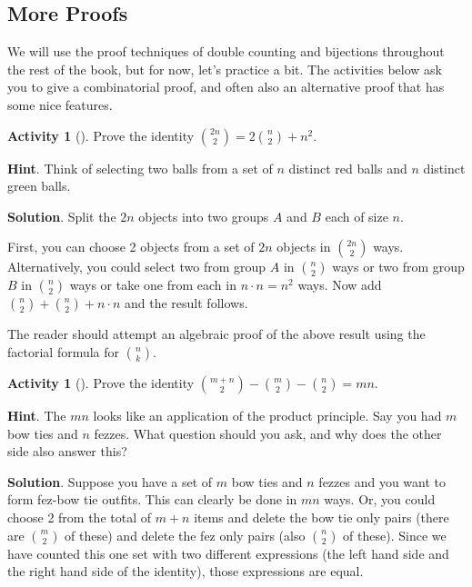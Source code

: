 \documentclass[10pt,]{book}
\theoremstyle{plain}
\theoremstyle{definition}
\theoremstyle{definition}
\theoremstyle{definition}
\newtheorem{activity}[project]{Activity}
\theoremstyle{definition}
\numberwithin{equation}{chapter}
\begin{document}
\subsection[{More Proofs}]{More Proofs}\label{subsec-moreproofs}
\hypertarget{p-581}{}%
We will use the proof techniques of double counting and bijections throughout the rest of the book, but for now, let's practice a bit.  The activities below ask you to give a combinatorial proof, and often also an alternative proof that has some nice features.%
\begin{activity}[]\label{act-redgreenballs}
\hypertarget{p-582}{}%
Prove the identity \(\binom{2n}{2} = 2 \binom{n}{2} + n^{2}\).%
\par\smallskip%
\noindent\textbf{Hint}.\hypertarget{hint-25}{}\quad%
\hypertarget{p-583}{}%
Think of selecting two balls from a set of \(n\) distinct red balls and \(n\) distinct green balls.%
\par\smallskip%
\noindent\textbf{Solution}.\hypertarget{solution-45}{}\quad%
\hypertarget{p-584}{}%
Split the \(2n\) objects into two groups \(A\) and \(B\) each of size \(n\).%
\par
\hypertarget{p-585}{}%
First, you can choose 2 objects from a set of \(2n\) objects in \(\binom{2n}{2}\) ways. Alternatively, you could select two from group \(A\) in \(\binom{n}{2}\) ways or two from group \(B\) in \(\binom{n}{2}\) ways or take one from each in \(n \cdot n = n^{2}\) ways. Now add \(\binom{n}{2} + \binom{n}{2}+ n \cdot n\) and the result follows.%
\end{activity}
\hypertarget{p-586}{}%
The reader should attempt an algebraic proof of the above result using the factorial formula for \(\binom{n}{k}\).%
\begin{activity}[]\label{act-bowtiefez}
\hypertarget{p-587}{}%
Prove the identity \(\binom{m + n}{2} - \binom{m}{2} - \binom{n}{2} = mn\).%
\par\smallskip%
\noindent\textbf{Hint}.\hypertarget{hint-26}{}\quad%
\hypertarget{p-588}{}%
The \(mn\) looks like an application of the product principle.  Say you had \(m\) bow ties and \(n\) fezzes.  What question should you ask, and why does the other side also answer this?%
\par\smallskip%
\noindent\textbf{Solution}.\hypertarget{solution-46}{}\quad%
\hypertarget{p-589}{}%
Suppose you have a set of \(m\) bow ties and \(n\) fezzes and you want to form fez-bow tie outfits. This can clearly be done in \(mn\) ways. Or, you could choose 2 from the total of \(m + n\) items and delete the bow tie only pairs (there are \(\binom{m}{2}\) of these) and delete the fez only pairs (also \(\binom{n}{2}\) of these). Since we have counted this one set with two different expressions (the left hand side and the right hand side of the identity), those expressions are equal.%
\end{activity}
\end{document}
